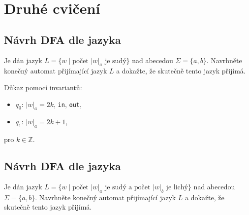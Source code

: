 \section{Druhé cvičení}

\subsection{Návrh DFA dle jazyka}

Je dán jazyk $L = \{w \mid \text{počet } |w|_a \text{ je sudý}\}$ nad abecedou $\Sigma = \{a,b\}$. Navrhněte konečný 
automat přijímající jazyk $L$ a dokažte, že skutečně tento jazyk přijímá. 

\begin{multicols}{2}
    
    Důkaz pomocí invariantů: 
    \begin{itemize}[noitemsep]
        \item $q_0$: $|w|_a = 2k$, \texttt{in}, \texttt{out}, 
        \item $q_1$: $|w|_a = 2k + 1$,  
    \end{itemize}
    pro $k \in \mathbb{Z}$.

\end{multicols}

\subsection{Návrh DFA dle jazyka}
Je dán jazyk $L = \{w \mid \text{počet } |w|_a \text{ je sudý a počet } |w|_b \text{ je lichý}\}$ nad abecedou 
$\Sigma = \{a,b\}$. Navrhněte konečný automat přijímající jazyk $L$ a dokažte, že skutečně tento jazyk přijímá. 

